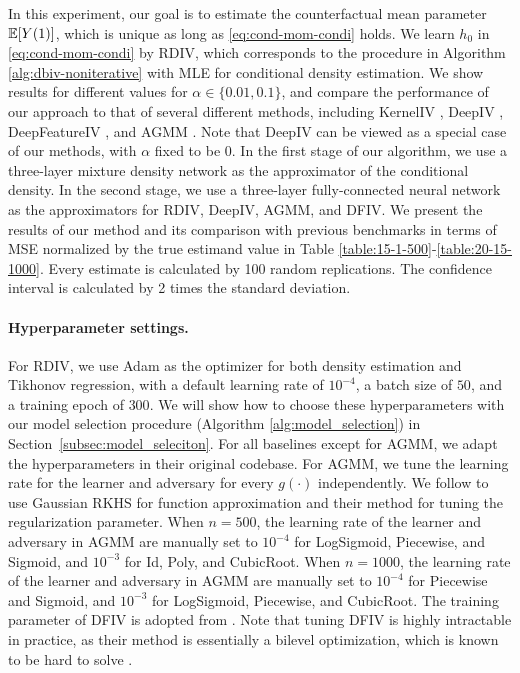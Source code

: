 In this experiment, our goal is to estimate the counterfactual mean parameter $\mathbb{E}[Y(1)]$, which is unique as long as \eqref{eq:cond-mom-condi} holds. We learn $h_0$ in \eqref{eq:cond-mom-condi} by RDIV, which corresponds to the procedure in Algorithm \ref{alg:dbiv-noniterative} with MLE for conditional density estimation.   We show results for different values for $\alpha \in \{0.01,0.1\}$, and compare the performance of our approach to that of several different methods, including KernelIV \citep{singh2019kernel}, DeepIV \citep{hartford2017deep}, DeepFeatureIV \citep{xu2021deep}, and AGMM \citep{DikkalaNishanth2020MEoC}. Note that DeepIV can be viewed as a special case of our methods, with $\alpha$ fixed to be 0. In the first stage of our algorithm, we use a three-layer mixture density network \citep{hartford2017deep,rothfuss2019conditional} as the approximator of the conditional density. In the second stage, we use a three-layer fully-connected neural network as the approximators for RDIV, DeepIV, AGMM, and DFIV. We present the results of our method and its comparison with previous benchmarks in terms of MSE normalized by the true estimand value in Table \ref{table:15-1-500}-\ref{table:20-15-1000}. Every estimate is calculated by 100 random replications.  The confidence interval is calculated by 2 times the standard deviation. 

\paragraph{Hyperparameter settings.} For RDIV, we use Adam as the optimizer for both density estimation and Tikhonov regression, with a default learning rate of $10^{-4}$, a batch size of $50$, and a training epoch of $300$. We will show how to choose these hyperparameters with our model selection procedure (Algorithm \ref{alg:model_selection}) in Section~\ref{subsec:model_seleciton}. For all baselines except for AGMM, we adapt the hyperparameters in their original codebase. For AGMM, we tune the learning rate for the learner and adversary for every $g(\cdot)$ independently. We follow \cite{singh2019kernel} to use Gaussian RKHS for function approximation and their method for tuning the regularization parameter. When $n=500$, the learning rate of the learner and adversary in AGMM are manually set to $10^{-4}$ for LogSigmoid, Piecewise, and Sigmoid, and $10^{-3}$ for Id, Poly, and CubicRoot. When $n=1000$, the learning rate of the learner and adversary in AGMM are manually set to $10^{-4}$ for Piecewise and Sigmoid, and $10^{-3}$ for LogSigmoid, Piecewise, and CubicRoot.  The training parameter of DFIV is adopted from \citet{xu2021deep}. Note that tuning DFIV is highly intractable in practice, as their method is essentially a bilevel optimization, which is known to be hard to solve \citep{hong2023two}.

